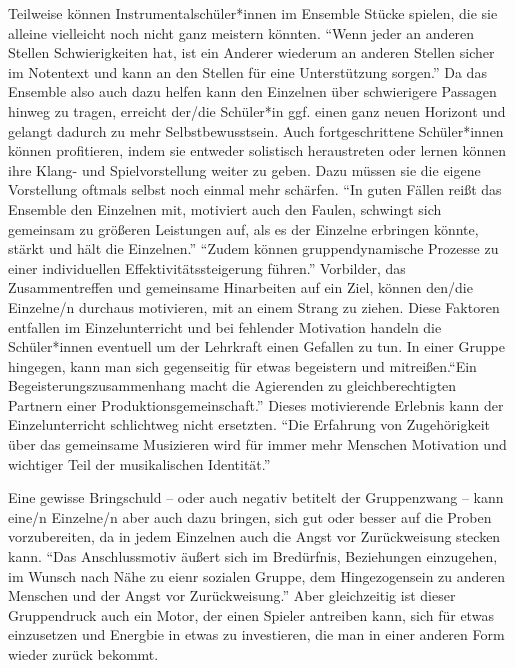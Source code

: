 Teilweise können Instrumentalschüler*innen im Ensemble Stücke spielen, die sie
alleine vielleicht noch nicht ganz meistern könnten. \enquote{Wenn jeder an
anderen Stellen Schwierigkeiten hat, ist ein Anderer wiederum an anderen Stellen
sicher im Notentext und kann an den Stellen für eine Unterstützung sorgen.}
\autocite[32]{losert:die_kunst_zu_unterrichten}
Da das Ensemble also auch dazu helfen kann den Einzelnen über schwierigere
Passagen hinweg zu tragen, erreicht der/die Schüler*in ggf. einen ganz neuen
Horizont und gelangt dadurch zu mehr Selbstbewusstsein. Auch fortgeschrittene
Schüler*innen können profitieren, indem sie entweder solistisch heraustreten
oder lernen können ihre Klang- und Spielvorstellung weiter zu geben. Dazu müssen
sie die eigene Vorstellung oftmals selbst noch einmal mehr schärfen. \enquote{In
guten Fällen reißt das Ensemble den Einzelnen mit, motiviert auch den Faulen,
schwingt sich gemeinsam zu größeren Leistungen auf, als es der Einzelne
erbringen könnte, stärkt und hält die Einzelnen.}
\autocite[94]{mitzscherlich:musikpsychologie} \enquote{Zudem können
gruppendynamische Prozesse zu einer individuellen Effektivitätssteigerung
führen.} \autocite{losert:die_kunst_zu_unterrichten} Vorbilder, das
Zusammentreffen und gemeinsame Hinarbeiten auf ein Ziel, können den/die
Einzelne/n durchaus motivieren, mit an einem Strang zu ziehen. Diese Faktoren
entfallen im Einzelunterricht und bei fehlender Motivation handeln die
Schüler*innen eventuell um der Lehrkraft einen Gefallen zu tun.
In einer Gruppe hingegen, kann man sich gegenseitig für etwas
begeistern und mitreißen.\enquote{Ein Begeisterungszusammenhang macht die
Agierenden zu gleichberechtigten Partnern einer Produktionsgemeinschaft.}
\autocite[198]{busch:grundwissen_instrumentalpaedagogik} Dieses motivierende
Erlebnis kann der Einzelunterricht schlichtweg nicht ersetzten. \enquote{Die
Erfahrung von Zugehörigkeit über das gemeinsame Musizieren wird für immer mehr
Menschen Motivation und wichtiger Teil der musikalischen Identität.}
\autocite[123]{mitzscherlich:musikpsychologie}

Eine gewisse Bringschuld – oder auch negativ betitelt der Gruppenzwang – kann eine/n
Einzelne/n aber auch dazu bringen, sich gut oder besser auf die Proben
vorzubereiten, da in jedem Einzelnen auch die Angst vor Zurückweisung stecken
kann. \enquote{Das Anschlussmotiv äußert sich im Bredürfnis, Beziehungen
einzugehen, im Wunsch nach Nähe zu eienr sozialen Gruppe, dem Hingezogensein zu
anderen Menschen und der Angst vor Zurückweisung.}
\autocite[120ff]{losert:die_kunst_zu_unterrichten} Aber gleichzeitig ist dieser
Gruppendruck auch ein Motor, der einen Spieler antreiben kann, sich für etwas
einzusetzen und Energbie in etwas zu investieren, die man in einer anderen Form
wieder zurück bekommt.






